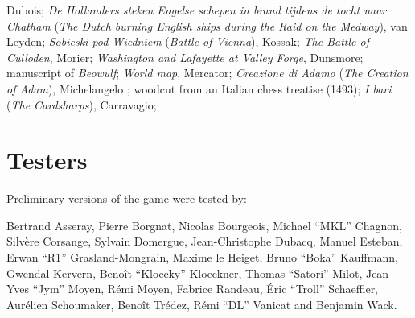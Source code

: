 Dubois;
\emph{De Hollanders steken Engelse schepen in brand tijdens de tocht naar
  Chatham} (\emph{The Dutch burning English ships during the Raid on the
  Medway}), %
van Leyden;
\emph{Sobieski pod Wiedniem} (\emph{Battle of Vienna}), %
Kossak;
\emph{The Battle of Culloden}, %
Morier;
\emph{Washington and Lafayette at Valley Forge}, %
Dunsmore;
manuscript of \emph{Beowulf};
\emph{World map}, %
Mercator;
\emph{Creazione di Adamo} (\emph{The Creation of Adam}), Michelangelo%
;
woodcut from an Italian chess treatise (1493);
\emph{I bari} (\emph{The Cardsharps}), %
Carravagio;






\section*{Testers}

Preliminary versions of the game were tested by:\par
Bertrand Asseray, Pierre Borgnat, Nicolas Bourgeois, Michael ``MKL'' Chagnon,
Silvère Corsange, Sylvain Domergue, Jean-Christophe Dubacq, Manuel Esteban,
Erwan ``R1'' Grasland-Mongrain, Maxime le Heiget, Bruno ``Boka'' Kauffmann,
Gwendal Kervern, Benoît ``Kloecky'' Kloeckner, Thomas ``Satori'' Milot,
Jean-Yves ``Jym'' Moyen, Rémi Moyen, Fabrice Randeau, Éric ``Troll''
Schaeffler, Aurélien Schoumaker, Benoît Trédez, Rémi ``DL'' Vanicat and
Benjamin Wack.

